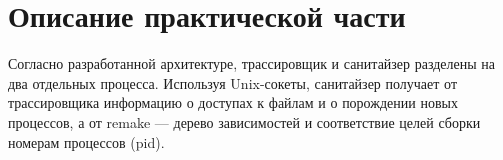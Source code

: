 \section{Описание практической части}
\label{sec:Chapter4} 


Согласно разработанной архитектуре, трассировщик и санитайзер разделены на два отдельных процесса. Используя Unix-сокеты, санитайзер получает от трассировщика информацию о доступах к файлам и о порождении новых процессов, а от remake --- дерево зависимостей и соответствие целей сборки номерам процессов (pid).

